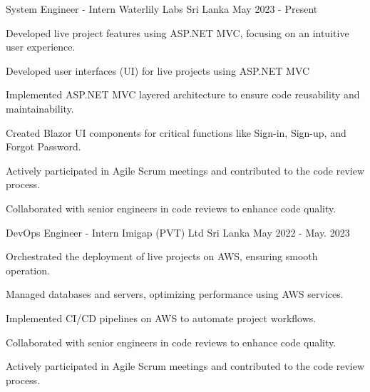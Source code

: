 

\begin{cventries}

  \cventry
  {System Engineer - Intern} %
  {Waterlily Labs} %
  {Sri Lanka} %
  {May 2023 - Present} %
  {
    \begin{cvitems} %
      \item {Developed live project features using ASP.NET MVC, focusing on an intuitive user experience.}
      \item {Developed user interfaces (UI) for live projects using ASP.NET MVC}
      \item {Implemented ASP.NET MVC layered architecture to ensure code reusability and maintainability.}
      \item {Created Blazor UI components for critical functions like Sign-in, Sign-up, and Forgot Password.}
      \item {Actively participated in Agile Scrum meetings and contributed to the code review process.}
      \item {Collaborated with senior engineers in code reviews to enhance code quality.}
    \end{cvitems}
  }

  \cventry
  {DevOps Engineer - Intern} %
  {Imigap (PVT) Ltd} %
  {Sri Lanka} %
  {May 2022 - May. 2023} %
  {
    \begin{cvitems} %
      \item {Orchestrated the deployment of live projects on AWS, ensuring smooth operation.}
      \item {Managed databases and servers, optimizing performance using AWS services.}
      \item {Implemented CI/CD pipelines on AWS to automate project workflows.}
      \item {Collaborated with senior engineers in code reviews to enhance code quality.}
      \item {Actively participated in Agile Scrum meetings and contributed to the code review process.}
    \end{cvitems}
  }


\end{cventries}
